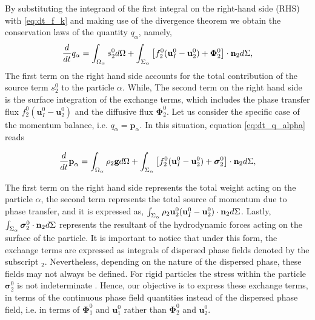 By substituting the integrand of the first integral on the right-hand side (RHS) with \ref{eq:dt_f_k} and making use of the divergence theorem we obtain the conservation laws of the quantity $q_\alpha$, namely,  
\begin{equation}
    \frac{d}{d t}  q_\alpha
    = \int_{\Omega_\alpha}  s_2^0  d\Omega
    + \int_{\Sigma_\alpha}  \left[
        f_2^0 (\textbf{u}_I^0-\textbf{u}_2^0) 
        + \mathbf{\Phi}_2^0 
        \right] \cdot \textbf{n}_2  d\Sigma,
    \label{eq:dt_q_alpha}
\end{equation}
The first term on the right hand side accounts for the total contribution of the source term $s_2^0$ to the particle $\alpha$.
While, The second term on the right hand side is the surface integration of the exchange terms, which includes the phase transfer flux $f_2^0 (\textbf{u}_I^0-\textbf{u}_2^0)$ and the diffusive flux $\mathbf{\Phi}_2^0$. 
Let us consider the specific case of the momentum balance, i.e. $q_\alpha = \textbf{p}_\alpha$.
In this situation, equation \eqref{eq:dt_q_alpha} reads

\begin{equation}
    \ddt  \textbf{p}_\alpha
    = \intO{ \rho_2\textbf{g} }
    + \intS{ \left[
        f_2^0 (\textbf{u}_I^0-\textbf{u}_2^0)
        + \bm{\sigma}_2^0%
        \right] \cdot \textbf{n}_2 },
    \label{eq:dt_q_alpha}
\end{equation}

The first term on the right hand side represents the total weight acting on the particle $\alpha$, the second term represents the total source of momentum due to phase transfer, and it is expressed as, $\int_{\Sigma_\alpha}  \rho_2 \textbf{u}_2^0 (\textbf{u}_I^0-\textbf{u}_2^0)\cdot\textbf{n}_2  d\Sigma$. 
Lastly, $\int_{\Sigma_\alpha}  \bm{\sigma}_2^0\cdot\textbf{n}_2  d\Sigma$ represents the resultant of the hydrodynamic forces acting on the surface of the particle.
It is important to notice that under this form, the exchange terms are expressed as integrals of dispersed phase fields denoted by the subscript $_2$.
Nevertheless, depending on the nature of the dispersed phase, these fields may not always be defined.
For rigid particles the stress within the particle $\bm{\sigma}_2^0$ is not indeterminate \citep{guazzelli2011}.  
Hence, our objective is to express these exchange terms, in terms of the continuous phase field quantities instead of the dispersed phase field, i.e. in terms of $\mathbf{\Phi}_1^0$ and $\textbf{u}_1^0$ rather than $\mathbf{\Phi}_2^0$ and $\textbf{u}_2^0$. 

